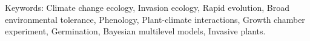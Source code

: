 \documentclass[11pt]{article}\usepackage[]{graphicx}\usepackage[]{color}
\begin{document}
\begin{abstract}
	\end{abstract}

Keywords: Climate change ecology, Invasion ecology, Rapid evolution, Broad environmental tolerance, Phenology, Plant-climate interactions, Growth chamber experiment, Germination, Bayesian multilevel models, Invasive plants.
\end{document}
